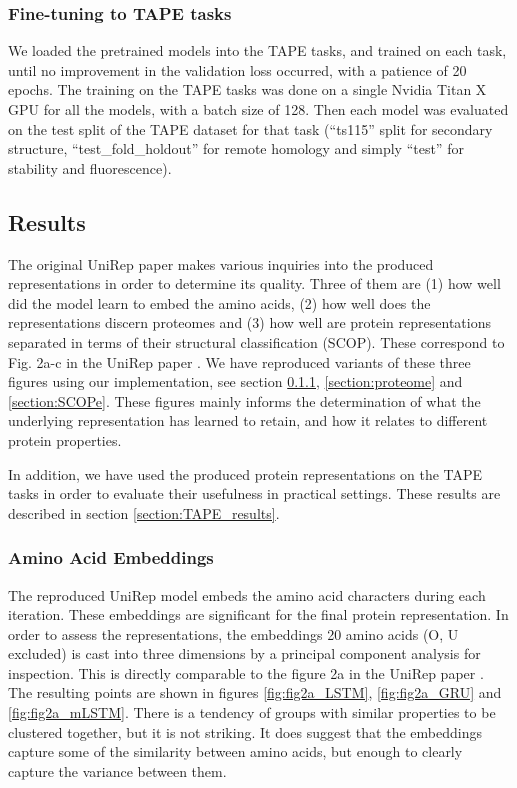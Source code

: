 \documentclass[a4paper,12pt]{article}
\begin{document}
\subsubsection{Fine-tuning to TAPE tasks}
We loaded the pretrained models into the TAPE tasks, and trained on each task, until no improvement in the validation loss occurred, with a patience of 20 epochs. The training on the TAPE tasks was done on a single Nvidia Titan X GPU for all the models, with a batch size of 128. Then each model was evaluated on the test split of the TAPE dataset for that task (``ts115'' split for secondary structure, ``test\_fold\_holdout'' for remote homology and simply ``test'' for stability and fluorescence).

\subsection{Results}
\label{section:reproduction_results}
The original UniRep paper makes various inquiries into the produced representations in order to determine its quality. Three of them are (1) how well did the model learn to embed the amino acids, (2) how well does the representations discern proteomes and (3) how well are protein representations separated in terms of their structural classification (SCOP). These correspond to Fig. 2a-c in the UniRep paper \cite{alley2019unified}. We have reproduced variants of these three figures using our implementation, see section \ref{section:amino}, \ref{section:proteome} and \ref{section:SCOPe}. These figures mainly informs the determination of what the underlying representation has learned to retain, and how it relates to different protein properties.

In addition, we have used the produced protein representations on the TAPE tasks in order to evaluate their usefulness in practical settings. These results are described in section \ref{section:TAPE_results}.

\subsubsection{Amino Acid Embeddings}
\label{section:amino}
The reproduced UniRep model embeds the amino acid characters during each iteration. These embeddings are significant for the final protein representation. In order to assess the representations, the embeddings 20 amino acids (O, U excluded) is cast into three dimensions by a principal component analysis for inspection. This is directly comparable to the figure 2a in the UniRep paper \cite{alley2019unified}. The resulting points are shown in figures \ref{fig:fig2a_LSTM}, \ref{fig:fig2a_GRU} and \ref{fig:fig2a_mLSTM}. There is a tendency of groups with similar properties to be clustered together, but it is not striking. It does suggest that the embeddings capture some of the similarity between amino acids, but enough to clearly capture the variance between them.
\end{document}
